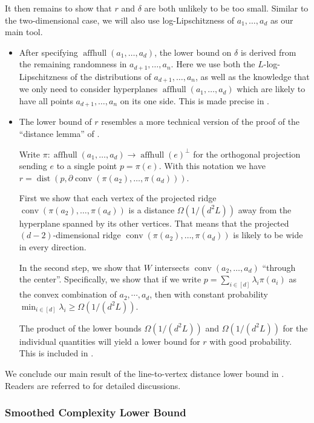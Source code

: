 \documentclass{theoretics}
\newcommand{\aff}{\operatorname{affhull}}
\newcommand{\conv}{\operatorname{conv}}
\newcommand{\dist}{\operatorname{dist}}
\begin{document}
It then remains to show that $r$ and $\delta$ are both unlikely to be too small. 
Similar to the two-dimensional case, we will also use log-Lipschitzness of $a_1, \ldots, a_d$ as our main tool.
\begin{itemize}
    \item After specifying $\aff(a_1,\dots,a_d)$, the lower bound on $\delta$ is derived from
        the remaining randomness in $a_{d+1},\dots,a_n$. Here we use both the $L$-log-Lipschitzness
        of the distributions of $a_{d+1},\dots,a_n$, as well as the knowledge that
        we only need to consider hyperplanes $\aff(a_1,\dots,a_d)$ which are
        likely to have all points $a_{d+1},\dots,a_n$ on its one side.
        This is made precise in .
    \item The lower bound of $r$ resembles a more technical version of the proof of the ``distance lemma'' of \cite{ST04}.

    Write $\pi : \aff(a_1,\dots,a_d) \to \aff(e)^\perp$
    for the orthogonal projection sending $e$ to a single point $p = \pi(e)$.
    With this notation we have $r = \dist(p, \partial\conv(\pi(a_2),\dots,\pi(a_d)))$.
    
        First we show that each vertex of the projected ridge $\conv(\pi(a_2), \ldots, \pi(a_d))$ is a distance $\Omega(1/(d^2L))$ away from the hyperplane spanned by its other vertices.
        That means that the projected $(d-2)$-dimensional ridge $\conv(\pi(a_2),\dots,\pi(a_d))$ is likely to be wide in every direction.

        In the second step, we show that $W$ intersects $\conv(a_2,\ldots,a_d)$ ``through the center''.
        Specifically, we show that if we write $p = \sum_{i \in [d]} \lambda_i \pi(a_i)$ as the convex combination of $a_2, \cdots, a_d$, 
        then with constant probability $\min_{i \in [d]}\lambda_i \geq \Omega(1/(d^2L))$.

        The product of the lower bounds $
        \Omega(1/(d^2L))$
        and $\Omega(1/(d^2L))$ for the individual quantities
        will yield a lower bound for $r$
        with good probability.
        This is included in .
\end{itemize}

We conclude our main result of the line-to-vertex distance lower bound in . Readers are referred to  for detailed discussions.


\subsubsection{Smoothed Complexity Lower Bound}
\end{document}
